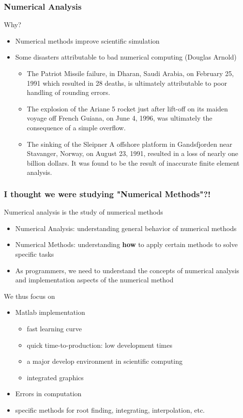 \documentclass[10pt]{beamer}
\begin{document}
\begin{frame}
\frametitle{Numerical Analysis}
Why?
\begin{itemize}
\item Numerical methods improve scientific simulation
\item Some disasters attributable to bad numerical computing (Douglas
Arnold)
\begin{itemize}
\item The Patriot Missile failure, in Dharan, Saudi Arabia, on February 25, 1991 which resulted in 28 deaths, is ultimately attributable to poor handling of rounding errors.
\item The explosion of the Ariane 5 rocket just after lift-off on its maiden voyage off French Guiana, on June 4, 1996, was ultimately the consequence of a simple overflow.
\item The sinking of the Sleipner A offshore platform in Gandsfjorden near Stavanger, Norway, on August 23, 1991, resulted in a loss of nearly one billion dollars. It was found to be the result of inaccurate finite element analysis.
\end{itemize}
\end{itemize}
\end{frame}
\begin{frame}
\frametitle{I thought we were studying "Numerical Methods"?!}
\begin{block}{}
Numerical analysis is the study of numerical methods
\end{block}
\begin{itemize}
\item Numerical Analysis: understanding general behavior of numerical
methods
\item Numerical Methods: understanding {\bf how} to apply certain methods to
solve specific tasks
\item As programmers, we need to understand the concepts of numerical
analysis and implementation aspects of the numerical method
\end{itemize}

We thus focus on 
\begin{itemize}
\item Matlab implementation
  \begin{itemize}
  \item fast learning curve
  \item quick time-to-production: low development times
  \item a major develop environment in scientific computing
  \item integrated graphics
  \end{itemize}
\item Errors in computation
\item specific methods for root finding, integrating, interpolation, etc.
\end{itemize}
\end{frame}
\end{document}
